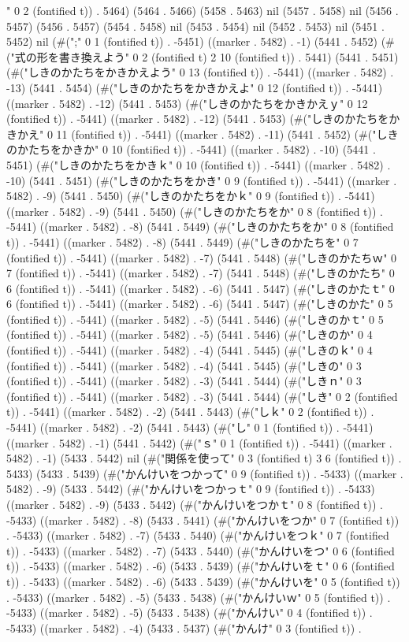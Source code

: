 " 0 2 (fontified t)) . 5464) (5464 . 5466) (5458 . 5463) nil (5457 . 5458) nil (5456 . 5457) (5456 . 5457) (5454 . 5458) nil (5453 . 5454) nil (5452 . 5453) nil (5451 . 5452) nil (#(";" 0 1 (fontified t)) . -5451) ((marker . 5482) . -1) (5441 . 5452) (#("式の形を書き換えよう" 0 2 (fontified t) 2 10 (fontified t)) . 5441) (5441 . 5451) (#("しきのかたちをかきかえよう" 0 13 (fontified t)) . -5441) ((marker . 5482) . -13) (5441 . 5454) (#("しきのかたちをかきかえよ" 0 12 (fontified t)) . -5441) ((marker . 5482) . -12) (5441 . 5453) (#("しきのかたちをかきかえｙ" 0 12 (fontified t)) . -5441) ((marker . 5482) . -12) (5441 . 5453) (#("しきのかたちをかきかえ" 0 11 (fontified t)) . -5441) ((marker . 5482) . -11) (5441 . 5452) (#("しきのかたちをかきか" 0 10 (fontified t)) . -5441) ((marker . 5482) . -10) (5441 . 5451) (#("しきのかたちをかきｋ" 0 10 (fontified t)) . -5441) ((marker . 5482) . -10) (5441 . 5451) (#("しきのかたちをかき" 0 9 (fontified t)) . -5441) ((marker . 5482) . -9) (5441 . 5450) (#("しきのかたちをかｋ" 0 9 (fontified t)) . -5441) ((marker . 5482) . -9) (5441 . 5450) (#("しきのかたちをか" 0 8 (fontified t)) . -5441) ((marker . 5482) . -8) (5441 . 5449) (#("しきのかたちをか" 0 8 (fontified t)) . -5441) ((marker . 5482) . -8) (5441 . 5449) (#("しきのかたちを" 0 7 (fontified t)) . -5441) ((marker . 5482) . -7) (5441 . 5448) (#("しきのかたちｗ" 0 7 (fontified t)) . -5441) ((marker . 5482) . -7) (5441 . 5448) (#("しきのかたち" 0 6 (fontified t)) . -5441) ((marker . 5482) . -6) (5441 . 5447) (#("しきのかたｔ" 0 6 (fontified t)) . -5441) ((marker . 5482) . -6) (5441 . 5447) (#("しきのかた" 0 5 (fontified t)) . -5441) ((marker . 5482) . -5) (5441 . 5446) (#("しきのかｔ" 0 5 (fontified t)) . -5441) ((marker . 5482) . -5) (5441 . 5446) (#("しきのか" 0 4 (fontified t)) . -5441) ((marker . 5482) . -4) (5441 . 5445) (#("しきのｋ" 0 4 (fontified t)) . -5441) ((marker . 5482) . -4) (5441 . 5445) (#("しきの" 0 3 (fontified t)) . -5441) ((marker . 5482) . -3) (5441 . 5444) (#("しきｎ" 0 3 (fontified t)) . -5441) ((marker . 5482) . -3) (5441 . 5444) (#("しき" 0 2 (fontified t)) . -5441) ((marker . 5482) . -2) (5441 . 5443) (#("しｋ" 0 2 (fontified t)) . -5441) ((marker . 5482) . -2) (5441 . 5443) (#("し" 0 1 (fontified t)) . -5441) ((marker . 5482) . -1) (5441 . 5442) (#("ｓ" 0 1 (fontified t)) . -5441) ((marker . 5482) . -1) (5433 . 5442) nil (#("関係を使って" 0 3 (fontified t) 3 6 (fontified t)) . 5433) (5433 . 5439) (#("かんけいをつかって" 0 9 (fontified t)) . -5433) ((marker . 5482) . -9) (5433 . 5442) (#("かんけいをつかっｔ" 0 9 (fontified t)) . -5433) ((marker . 5482) . -9) (5433 . 5442) (#("かんけいをつかｔ" 0 8 (fontified t)) . -5433) ((marker . 5482) . -8) (5433 . 5441) (#("かんけいをつか" 0 7 (fontified t)) . -5433) ((marker . 5482) . -7) (5433 . 5440) (#("かんけいをつｋ" 0 7 (fontified t)) . -5433) ((marker . 5482) . -7) (5433 . 5440) (#("かんけいをつ" 0 6 (fontified t)) . -5433) ((marker . 5482) . -6) (5433 . 5439) (#("かんけいをｔ" 0 6 (fontified t)) . -5433) ((marker . 5482) . -6) (5433 . 5439) (#("かんけいを" 0 5 (fontified t)) . -5433) ((marker . 5482) . -5) (5433 . 5438) (#("かんけいｗ" 0 5 (fontified t)) . -5433) ((marker . 5482) . -5) (5433 . 5438) (#("かんけい" 0 4 (fontified t)) . -5433) ((marker . 5482) . -4) (5433 . 5437) (#("かんけ" 0 3 (fontified t)) . 
